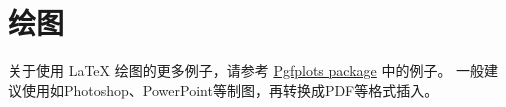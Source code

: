 

\section{绘图}

关于使用 \LaTeX{} 绘图的更多例子，请参考 \href{https://www.overleaf.com/learn/latex/Pgfplots_package}{Pgfplots package} 中的例子。
一般建议使用如Photoshop、PowerPoint等制图，再转换成PDF等格式插入。
